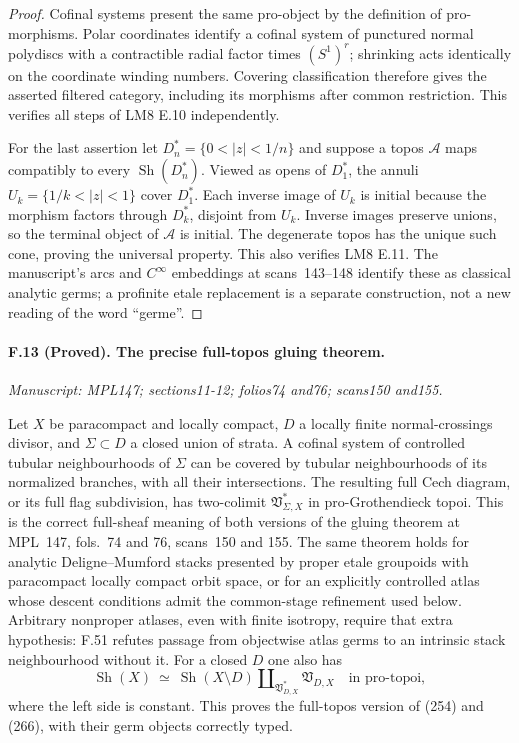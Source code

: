 \begin{proof}
Cofinal systems present the same pro-object by the definition of
pro-morphisms. Polar coordinates identify a cofinal system of punctured
normal polydiscs with a contractible radial factor times $(S^1)^r$;
shrinking acts identically on the coordinate winding numbers. Covering
classification therefore gives the asserted filtered category, including
its morphisms after common restriction. This verifies all steps of
LM8 E.10 independently.

For the last assertion let $D_n^*=\{0<|z|<1/n\}$ and suppose a topos
$\mathcal A$ maps compatibly to every $\operatorname{Sh}(D_n^*)$. Viewed
as opens of $D_1^*$, the annuli $U_k=\{1/k<|z|<1\}$ cover $D_1^*$.
Each inverse image of $U_k$ is initial because the morphism factors
through $D_k^*$, disjoint from $U_k$. Inverse images preserve unions,
so the terminal object of $\mathcal A$ is initial. The degenerate topos
has the unique such cone, proving the universal property. This also
verifies LM8 E.11. The manuscript's arcs and $C^\infty$ embeddings at
scans~143--148 identify these as classical analytic germs; a profinite
etale replacement is a separate construction, not a new reading of the
word ``germe''.
\end{proof}

\paragraph{F.13 (Proved). The precise full-topos gluing theorem.}
\textit{Manuscript: MPL147; sections11-12; folios74 and76; scans150 and155.}

Let $X$ be paracompact and locally compact, $D$ a locally finite
normal-crossings divisor, and $\Sigma\subset D$ a closed union of
strata. A cofinal system of controlled tubular neighbourhoods of $\Sigma$
can be covered by tubular neighbourhoods of its normalized branches,
with all their intersections. The resulting full Cech diagram, or its
full flag subdivision, has two-colimit
$\mathfrak V^*_{\Sigma,X}$ in pro-Grothendieck topoi. This is the correct
full-sheaf meaning of both versions of the gluing theorem at MPL~147,
fols.~74 and 76, scans~150 and 155. The same theorem holds for analytic
Deligne--Mumford stacks presented by proper etale groupoids with
paracompact locally compact orbit space, or for an explicitly controlled
atlas whose descent conditions admit the common-stage refinement used
below. Arbitrary nonproper atlases, even with finite isotropy, require
that extra hypothesis: F.51 refutes passage from objectwise atlas germs to
an intrinsic stack neighbourhood without it. For a closed $D$ one also has
\[
 \operatorname{Sh}(X)\ \simeq\
 \operatorname{Sh}(X\setminus D)
       \amalg_{\mathfrak V^*_{D,X}}\mathfrak V_{D,X}
 \quad\text{in pro-topoi},
\]
where the left side is constant. This proves the full-topos version of
(254) and (266), with their germ objects correctly typed.

